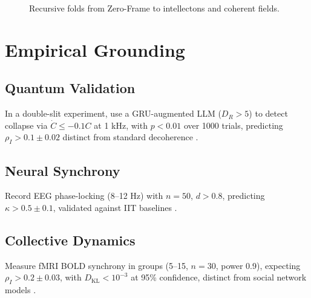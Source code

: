 \documentclass[11pt]{article}
\newcommand{\intellecton}{\mathcal{I}} %
\newcommand{\dkl}{D_{\text{KL}}}
\begin{document}
\begin{figure}[h]
\centering
{}
\caption{Recursive folds from Zero-Frame to intellectons and coherent fields.}
\label{fig:lattice}
\end{figure}

\section{Empirical Grounding}
\label{sec:empirical}

\subsection{Quantum Validation}
In a double-slit experiment, use a GRU-augmented LLM ($D_R > 5$) to detect collapse via $\dot{C} \leq -0.1 C$ at 1 kHz, with $p < 0.01$ over 1000 trials, predicting $\rho_I > 0.1 \pm 0.02$ distinct from standard decoherence \citep{engel2023}.

\subsection{Neural Synchrony}
Record EEG phase-locking (8--12 Hz) with $n = 50$, $d > 0.8$, predicting $\kappa > 0.5 \pm 0.1$, validated against IIT baselines \citep{panksepp1998, tononi2023}.

\subsection{Collective Dynamics}
Measure fMRI BOLD synchrony in groups (5--15, $n = 30$, power 0.9), expecting $\rho_I > 0.2 \pm 0.03$, with $\dkl < 10^{-3}$ at 95\% confidence, distinct from social network models \citep{couzin2023}.
\end{document}

